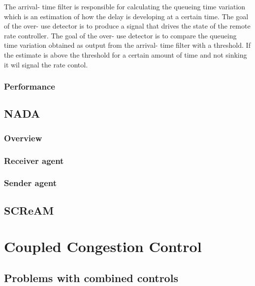 \documentclass[UKenglish]{ifimaster}
\begin{document}
The arrival- time filter is responsible for calculating the queueing time variation which is an estimation of how the delay is developing at a certain time.
The goal of the over- use detector is to produce a signal that drives the state of the remote rate controller. 
The goal of the over- use detector is to compare the queueing time variation obtained as output from the arrival- time filter with a threshold. If the estimate is above the threshold for a certain amount of time and not sinking it wil signal the rate contol.
\subsubsection{Performance}
\subsection{NADA}
\subsubsection{Overview}
\subsubsection{Receiver agent}

\subsubsection{Sender agent}

\subsection{SCReAM}


\section{Coupled Congestion Control}
\subsection{Problems with combined controls}
\end{document}
